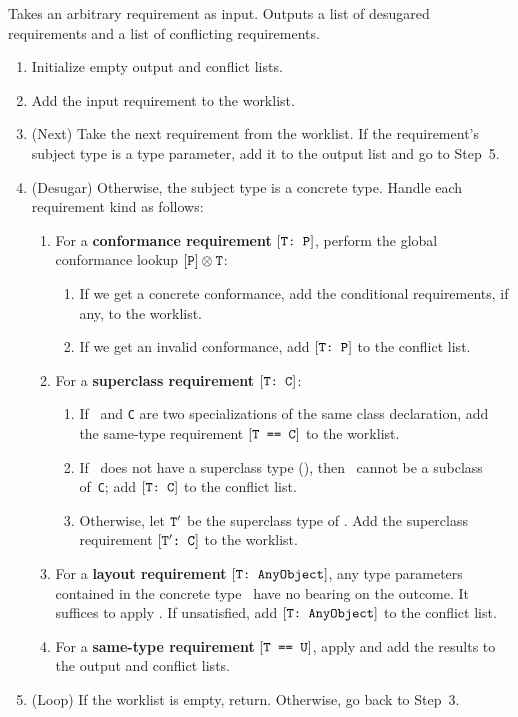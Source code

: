 \documentclass[../generics]{subfiles}
\begin{document}
\begin{algorithm}\label{requirement desugaring algorithm}
Takes an arbitrary requirement as input. Outputs a list of desugared requirements and a list of conflicting requirements.
\begin{enumerate}
\item Initialize empty output and conflict lists.
\item Add the input requirement to the worklist.
\item (Next) Take the next requirement from the worklist. If the requirement's subject type is a type parameter, add it to the output list and go to Step~5.
\item (Desugar) Otherwise, the subject type is a concrete type. Handle each requirement kind as follows:
\begin{enumerate}
\item For a \textbf{conformance requirement} $[\texttt{T:~P}]$, perform the global conformance lookup $[\texttt{P}]\otimes\texttt{T}$:
\begin{enumerate}
\item If we get a concrete conformance, add the conditional requirements, if any, to the worklist.
\item If we get an invalid conformance, add $[\texttt{T:~P}]$ to the conflict list.
\end{enumerate}
\item For a \textbf{superclass requirement} $[\texttt{T:~C}]$:
\begin{enumerate}
\item If \tT\ and \texttt{C} are two specializations of the same class declaration, add the same-type requirement $[\texttt{T == C}]$ to the worklist.
\item If \tT\ does not have a superclass type (), then \tT\ cannot be a subclass of~\texttt{C}; add $[\texttt{T:~C}]$ to the conflict list.
\item Otherwise, let $\texttt{T}^\prime$ be the superclass type of \tT. Add the superclass requirement $[\texttt{$\texttt{T}^\prime$:~C}]$ to the worklist.
\end{enumerate}
\item For a \textbf{layout requirement} $[\texttt{T:~AnyObject}]$, any type parameters contained in the concrete type \tT\ have no bearing on the outcome. It suffices to apply . If unsatisfied, add $[\texttt{T:~AnyObject}]$ to the conflict list.
\item For a \textbf{same-type requirement} $[\texttt{T == U}]$, apply  and add the results to the output and conflict lists.
\end{enumerate}
\item (Loop) If the worklist is empty, return. Otherwise, go back to Step~3.
\end{enumerate}
\end{algorithm}
\end{document}
